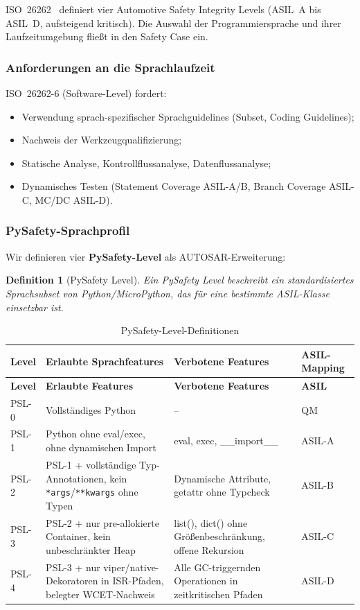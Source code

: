 ﻿\documentclass[12pt,a4paper,twoside]{article}
\newtheorem{definition}{Definition}[section]
\begin{document}
ISO~26262~\cite{iso26262_2018} definiert vier Automotive Safety Integrity Levels
(ASIL~A bis ASIL~D, aufsteigend kritisch). Die Auswahl der Programmiersprache
und ihrer Laufzeitumgebung fließt in den Safety Case ein.

\subsubsection{Anforderungen an die Sprachlaufzeit}
ISO~26262-6 (Software-Level) fordert:
\begin{itemize}
  \item Verwendung sprach-spezifischer Sprachguidelines
        (Subset, Coding Guidelines);
  \item Nachweis der Werkzeugqualifizierung;
  \item Statische Analyse, Kontrollflussanalyse, Datenflussanalyse;
  \item Dynamisches Testen (Statement Coverage ASIL-A/B,
        Branch Coverage ASIL-C, MC/DC ASIL-D).
\end{itemize}

\subsubsection{PySafety-Sprachprofil}
\label{sec:sprachprofil}

Wir definieren vier \textbf{PySafety-Level} als AUTOSAR-Erweiterung:

\begin{definition}[PySafety Level]
  Ein PySafety Level beschreibt ein standardisiertes Sprachsubset
  von Python/MicroPython, das für eine bestimmte ASIL-Klasse einsetzbar ist.
\end{definition}

\begin{longtable}{lp{5cm}p{5cm}l}
\caption{PySafety-Level-Definitionen}
\label{tab:pysafety}\\
\toprule
\textbf{Level} & \textbf{Erlaubte Sprachfeatures} & \textbf{Verbotene Features} & \textbf{ASIL-Mapping} \\
\midrule
\endfirsthead
\toprule
\textbf{Level} & \textbf{Erlaubte Features} & \textbf{Verbotene Features} & \textbf{ASIL} \\
\midrule
\endhead
\bottomrule
\endfoot
PSL-0 & Vollständiges Python & -- & QM \\
PSL-1 & Python ohne eval/exec, ohne dynamischen Import & eval, exec, \_\_import\_\_ & ASIL-A \\
PSL-2 & PSL-1 + vollständige Typ-Annotationen, kein \texttt{*args}/\texttt{**kwargs} ohne Typen & Dynamische Attribute, getattr ohne Typcheck & ASIL-B \\
PSL-3 & PSL-2 + nur pre-allokierte Container, kein unbeschränkter Heap & list(), dict() ohne Größenbeschränkung, offene Rekursion & ASIL-C \\
PSL-4 & PSL-3 + nur viper/native-Dekoratoren in ISR-Pfaden, belegter WCET-Nachweis & Alle GC-triggernden Operationen in zeitkritischen Pfaden & ASIL-D \\
\end{longtable}
\end{document}

